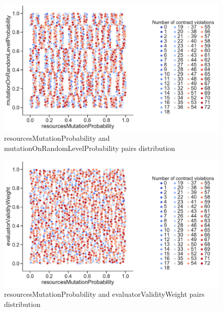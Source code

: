 \begin{figure}
	\centering
	\includegraphics[width=\textwidth]{images/PairsDistr/resourcesMutationProbability_mutationOnRandomLevelProbability.pdf}
	\caption[resourcesMutationProbability and mutationOnRandomLevelProbability pairs distribution]{resourcesMutationProbability and mutationOnRandomLevelProbability pairs distribution}
	\label{fig:resourcesMutationProbability_mutationOnRandomLevelProbability_pair}
\end{figure}
\clearpage
\begin{figure}
	\centering
	\includegraphics[width=\textwidth]{images/PairsDistr/resourcesMutationProbability_evaluatorValidityWeight.pdf}
	\caption[resourcesMutationProbability and evaluatorValidityWeight pairs distribution]{resourcesMutationProbability and evaluatorValidityWeight pairs distribution}
	\label{fig:resourcesMutationProbability_evaluatorValidityWeight_pair}
\end{figure}
\clearpage
